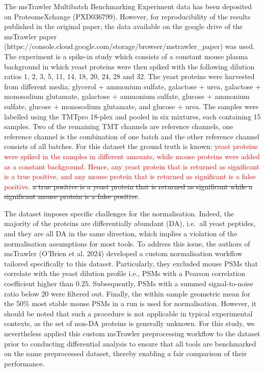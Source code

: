 \documentclass[
  letterpaper,
  DIV=11,
  numbers=noendperiod]{scrartcl}
\begin{document}
The msTrawler Multibatch Benchmarking Experiment data has been deposited
on ProteomeXchange (PXD036799). However, for reproducibility of the
results published in the original paper, the data available on the
google drive of the msTrawler paper
(https://console.cloud.google.com/storage/browser/mstrawler\_paper) was
used. The experiment is a spike-in study which consists of a constant
mouse plasma background in which yeast proteins were then spiked with
the following dilution ratios 1, 2, 3, 5, 11, 14, 18, 20, 24, 28 and 32.
The yeast proteins were harvested from different media; glycerol +
ammonium sulfate, galactose + urea, galactose + monosodium glutamate,
galactose + ammonium sulfate, glucose + ammonium sulfate, glucose +
monosodium glutamate, and glucose + urea. The samples were labelled
using the TMTpro 18-plex and pooled in six mixtures, each containing 15
samples. Two of the remaining TMT channels are reference channels, one
reference channel is the combination of one batch and the other
reference channel consists of all batches. For this dataset the ground
truth is known:
\textcolor{red}{yeast proteins were spiked in the samples in different amounts, while mouse proteins were added as a constant background. Hence, any yeast protein that is returned as significant is a true positive, and any mouse protein that is returned as significant is a false positive.}
\sout{a true positive is a yeast protein that is returned as significant while a significant mouse protein is a false positive}.

The dataset imposes specific challenges for the normalisation. Indeed,
the majority of the proteins are differentially abundant (DA), i.e.~all
yeast peptides, and they are all DA in the same direction, which implies
a violation of the normalisation assumptions for most tools. To address
this issue, the authors of msTrawler (O'Brien et al. 2024) developed a
custom normalisation workflow tailored specifically to this dataset.
Particularly, they excluded mouse PSMs that correlate with the yeast
dilution profile i.e., PSMs with a Pearson correlation coefficient
higher than 0.25. Subsequently, PSMs with a summed signal-to-noise ratio
below 20 were filtered out. Finally, the within sample geometric mean
for the 50\% most stable mouse PSMs in a run is used for normalisation.
However, it should be noted that such a procedure is not applicable in
typical experimental contexts, as the set of non-DA proteins is
generally unknown. For this study, we nevertheless applied this custom
msTrawler preprocessing workflow to the dataset prior to conducting
differential analysis to ensure that all tools are benchmarked on the
same preprocessed dataset, thereby enabling a fair comparison of their
performance.
\end{document}

